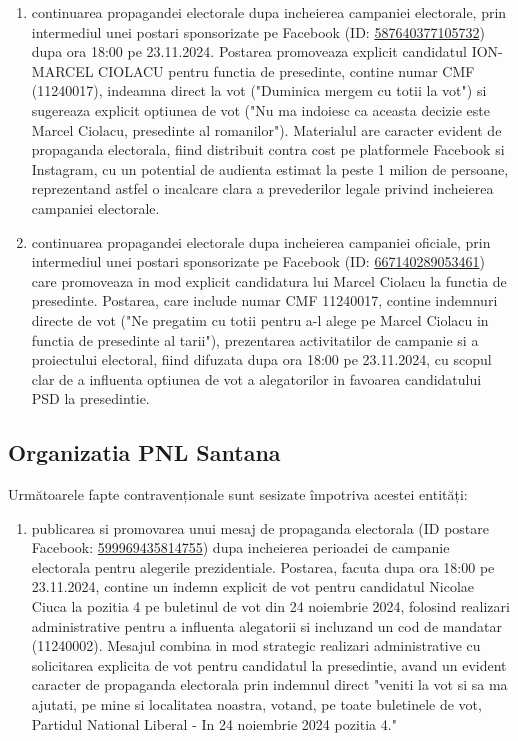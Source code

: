 \documentclass[a4paper,12pt]{article}
\begin{document}
\begin{enumerate}[leftmargin=*, label=\arabic*.)]
    \item continuarea propagandei electorale dupa incheierea campaniei electorale, prin intermediul unei postari sponsorizate pe Facebook (ID: \href{https://www.facebook.com/ads/library/?id=587640377105732}{587640377105732}) dupa ora 18:00 pe 23.11.2024. Postarea promoveaza explicit candidatul ION-MARCEL CIOLACU pentru functia de presedinte, contine numar CMF (11240017), indeamna direct la vot ("Duminica mergem cu totii la vot") si sugereaza explicit optiunea de vot ("Nu ma indoiesc ca aceasta decizie este Marcel Ciolacu, presedinte al romanilor"). Materialul are caracter evident de propaganda electorala, fiind distribuit contra cost pe platformele Facebook si Instagram, cu un potential de audienta estimat la peste 1 milion de persoane, reprezentand astfel o incalcare clara a prevederilor legale privind incheierea campaniei electorale.
    \item continuarea propagandei electorale dupa incheierea campaniei oficiale, prin intermediul unei postari sponsorizate pe Facebook (ID: \href{https://www.facebook.com/ads/library/?id=667140289053461}{667140289053461}) care promoveaza in mod explicit candidatura lui Marcel Ciolacu la functia de presedinte. Postarea, care include numar CMF 11240017, contine indemnuri directe de vot ("Ne pregatim cu totii pentru a-l alege pe Marcel Ciolacu in functia de presedinte al tarii"), prezentarea activitatilor de campanie si a proiectului electoral, fiind difuzata dupa ora 18:00 pe 23.11.2024, cu scopul clar de a influenta optiunea de vot a alegatorilor in favoarea candidatului PSD la presedintie.
\end{enumerate}

\vspace{0.5cm}

\subsection{Organizatia PNL Santana}
Următoarele fapte contravenționale sunt sesizate împotriva acestei entități:

\begin{enumerate}[leftmargin=*, label=\arabic*.)]
    \item publicarea si promovarea unui mesaj de propaganda electorala (ID postare Facebook: \href{https://www.facebook.com/ads/library/?id=599969435814755}{599969435814755}) dupa incheierea perioadei de campanie electorala pentru alegerile prezidentiale. Postarea, facuta dupa ora 18:00 pe 23.11.2024, contine un indemn explicit de vot pentru candidatul Nicolae Ciuca la pozitia 4 pe buletinul de vot din 24 noiembrie 2024, folosind realizari administrative pentru a influenta alegatorii si incluzand un cod de mandatar (11240002). Mesajul combina in mod strategic realizari administrative cu solicitarea explicita de vot pentru candidatul la presedintie, avand un evident caracter de propaganda electorala prin indemnul direct "veniti la vot si sa ma ajutati, pe mine si localitatea noastra, votand, pe toate buletinele de vot, Partidul National Liberal - In 24 noiembrie 2024 pozitia 4."
\end{enumerate}
\end{document}
